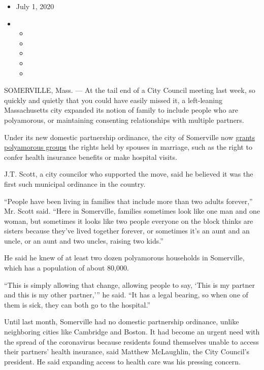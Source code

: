 \begin{itemize}
\item
  July 1, 2020
\item
  \begin{itemize}
  \item
  \item
  \item
  \item
  \item
  \end{itemize}
\end{itemize}

SOMERVILLE, Mass. --- At the tail end of a City Council meeting last
week, so quickly and quietly that you could have easily missed it, a
left-leaning Massachusetts city expanded its notion of family to include
people who are polyamorous, or maintaining consenting relationships with
multiple partners.

Under its new domestic partnership ordinance, the city of Somerville now
\href{https://www.wickedlocal.com/news/20200701/somerville-recognizes-polyamorous-domestic-partnerships}{grants
polyamorous groups} the rights held by spouses in marriage, such as the
right to confer health insurance benefits or make hospital visits.

J.T. Scott, a city councilor who supported the move, said he believed it
was the first such municipal ordinance in the country.

``People have been living in families that include more than two adults
forever,'' Mr. Scott said. ``Here in Somerville, families sometimes look
like one man and one woman, but sometimes it looks like two people
everyone on the block thinks are sisters because they've lived together
forever, or sometimes it's an aunt and an uncle, or an aunt and two
uncles, raising two kids.''

He said he knew of at least two dozen polyamorous households in
Somerville, which has a population of about 80,000.

``This is simply allowing that change, allowing people to say, `This is
my partner and this is my other partner,''' he said. ``It has a legal
bearing, so when one of them is sick, they can both go to the
hospital.''

Until last month, Somerville had no domestic partnership ordinance,
unlike neighboring cities like Cambridge and Boston. It had become an
urgent need with the spread of the coronavirus because residents found
themselves unable to access their partners' health insurance, said
Matthew McLaughlin, the City Council's president. He said expanding
access to health care was his pressing concern.

